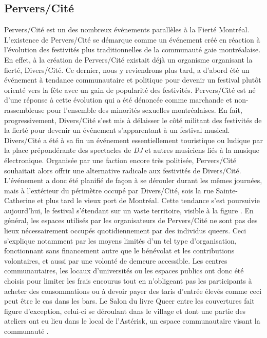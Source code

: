 \subsection{Pervers/Cité}
\label{subsec:perverscite}
Pervers/Cité est un des nombreux événements parallèles à la Fierté Montréal.
L'existence de Pervers/Cité se démarque comme un événement créé en réaction à l'évolution des festivités plus traditionnelles de la communauté gaie montréalaise.
En effet, à la création de Pervers/Cité existait déjà un organisme organisant la fierté, Divers/Cité.
Ce dernier, nous y reviendrons plus tard, a d'abord été un événement à tendance communautaire et politique pour devenir un festival plutôt orienté vers la fête avec un gain de popularité des festivités.
Pervers/Cité est né d'une réponse à cette évolution qui a été dénoncée comme marchande et non-rassembleuse pour l'ensemble des minorités sexuelles montréalaises.
En fait, progressivement, Divers/Cité s'est mis à délaisser le côté militant des festivités de la fierté pour  devenir un événement s'apparentant à un festival musical. 
Divers/Cité a été à sa fin un événement essentiellement touristique ou ludique par la place prépondérante des spectacles de \emph{DJ} et autres musiciens liés à la musique électronique.
Organisée par une faction encore très politisée, Pervers/Cité souhaitait alors offrir une alternative radicale aux festivités de Divers/Cité. 
L'événement a donc été planifié de façon à se dérouler durant les mêmes journées, mais à l'extérieur du périmètre occupé par Divers/Cité, sois la rue Sainte-Catherine et plus tard le vieux port de Montréal.
Cette tendance s'est poursuivie aujourd'hui, le festival s'étendant sur un vaste territoire, visible à la figure .
En général, les espaces utilisés par les organisateurs de Pervers/Cité ne sont pas des lieux nécessairement occupés quotidiennement par des individus queers.
Ceci s'explique notamment par les moyens limités d'un tel type d'organisation, fonctionnant sans financement autre que le bénévolat et les contributions volontaires, et aussi par une volonté de demeure accessible.
Les centres communautaires, les locaux d'universités ou les espaces publics ont donc été choisis pour limiter les frais encourus tout en n’obligeant pas les participants à acheter des consommations ou à devoir payer des taris d'entrée élevés comme ceci peut être le cas dans les bars.
Le Salon du livre Queer entre les couvertures fait figure d'exception, celui-ci se déroulant dans le village et dont une partie des ateliers ont eu lieu dans le local de l'Astérisk, un espace communautaire visant la communauté \lgbt{}.


